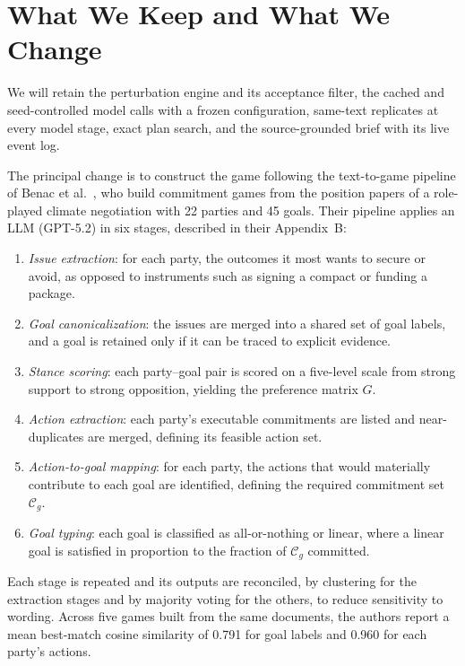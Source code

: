 \documentclass[10pt,twocolumn,letterpaper]{article}
\begin{document}
\section{What We Keep and What We Change}

We will retain the perturbation engine and its acceptance filter, the cached and seed-controlled model calls with a frozen configuration, same-text replicates at every model stage, exact plan search, and the source-grounded brief with its live event log.

The principal change is to construct the game following the text-to-game pipeline of Benac et al.~\cite{benac}, who build commitment games from the position papers of a role-played climate negotiation with 22 parties and 45 goals. Their pipeline applies an LLM (GPT-5.2) in six stages, described in their Appendix~B:
\begin{enumerate}[leftmargin=1.3em,itemsep=0pt,topsep=0.3ex,parsep=0pt]
\item \textit{Issue extraction}: for each party, the outcomes it most wants to secure or avoid, as opposed to instruments such as signing a compact or funding a package.
\item \textit{Goal canonicalization}: the issues are merged into a shared set of goal labels, and a goal is retained only if it can be traced to explicit evidence.
\item \textit{Stance scoring}: each party--goal pair is scored on a five-level scale from strong support to strong opposition, yielding the preference matrix $G$.
\item \textit{Action extraction}: each party's executable commitments are listed and near-duplicates are merged, defining its feasible action set.
\item \textit{Action-to-goal mapping}: for each party, the actions that would materially contribute to each goal are identified, defining the required commitment set $\mathcal{C}_g$.
\item \textit{Goal typing}: each goal is classified as all-or-nothing or linear, where a linear goal is satisfied in proportion to the fraction of $\mathcal{C}_g$ committed.
\end{enumerate}
Each stage is repeated and its outputs are reconciled, by clustering for the extraction stages and by majority voting for the others, to reduce sensitivity to wording. Across five games built from the same documents, the authors report a mean best-match cosine similarity of 0.791 for goal labels and 0.960 for each party's actions.
\end{document}
